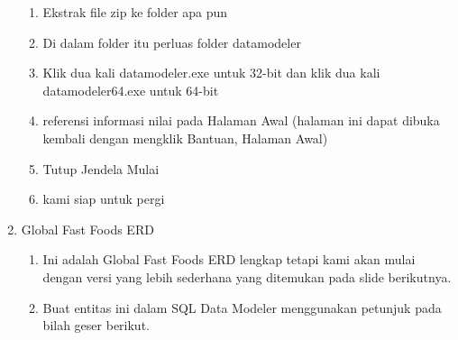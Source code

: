 \documentclass[12pt, times new roman, a4paper]{article}
\begin{document}
\begin{enumerate}
\begin{enumerate}
\item Ekstrak file zip ke folder apa pun
\item Di dalam folder itu perluas folder datamodeler
\item Klik dua kali datamodeler.exe untuk 32-bit dan klik dua kali datamodeler64.exe untuk 64-bit
\item referensi informasi nilai pada Halaman Awal (halaman ini dapat dibuka kembali dengan mengklik Bantuan, Halaman Awal)
\item Tutup Jendela Mulai
\item kami siap untuk pergi
\end{enumerate}
\item Global Fast Foods ERD
\begin{enumerate}
\item Ini adalah Global Fast Foods ERD lengkap tetapi kami akan mulai dengan versi yang lebih sederhana yang ditemukan pada slide berikutnya.
\item Buat entitas ini dalam SQL Data Modeler menggunakan petunjuk pada bilah geser berikut.
\end{enumerate}
\end{enumerate}
\end{document}

